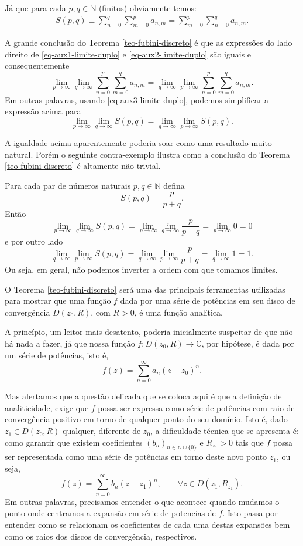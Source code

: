 Já que para cada $p,q\in\mathbb{N}$ (finitos) obviamente temos:
\begin{align}
\label{eq-aux3-limite-duplo}
S(p,q) 
\equiv 
\sum_{n=0}^{q} \sum_{m=0}^{p}a_{n,m} 
= 
\sum_{m=0}^{p}\sum_{n=0}^{q} a_{n,m}. 
\end{align}

A grande conclusão do Teorema \ref{teo-fubini-discreto} é que
as expressões do lado direito de \eqref{eq-aux1-limite-duplo}
e \eqref{eq-aux2-limite-duplo} são iguais e consequentemente 
\[
\lim_{p\to\infty} \lim_{q\to\infty} \sum_{n=0}^{p} \sum_{m=0}^{q}a_{n,m}
=
\lim_{q\to\infty}\lim_{p\to\infty} \sum_{n=0}^{p} \sum_{m=0}^{q}a_{n,m}.
\]
Em outras palavras, usando \eqref{eq-aux3-limite-duplo}, podemos simplificar
a expressão acima para
\[
\lim_{p\to\infty} \lim_{q\to\infty} S(p,q)
=
\lim_{q\to\infty}\lim_{p\to\infty} S(p,q).
\]

A igualdade acima aparentemente poderia soar como uma resultado muito natural. 
Porém o seguinte contra-exemplo ilustra como a conclusão do Teorema
\ref{teo-fubini-discreto} é altamente não-trivial.

\begin{exemplo}
Para cada par de números naturais $p,q\in\mathbb{N}$ defina 
\[
S(p,q) =  \frac{p}{p+q}.
\]
Então 
\[
\lim_{p\to\infty} \lim_{q\to\infty} S(p,q)
= 
\lim_{p\to\infty} \lim_{q\to\infty} \frac{p}{p+q}
= 
\lim_{p\to\infty} 0
=0
\]
e por outro lado 
\[
\lim_{q\to\infty}\lim_{p\to\infty} S(p,q)
=
\lim_{q\to\infty} \lim_{p\to\infty} \frac{p}{p+q}
=
\lim_{q\to\infty} 1
=1.
\]
Ou seja, em geral, não podemos inverter a ordem com que tomamos
limites.
\end{exemplo}


O Teorema \ref{teo-fubini-discreto} será uma das principais ferramentas utilizadas 
para mostrar que uma função $f$ dada por uma série
de potências em seu disco de convergência $D(z_0,R)$, com $R>0$,  
é uma função analítica.

A princípio, um leitor mais desatento, poderia inicialmente suspeitar de 
que não há nada a fazer, já que nossa função 
$f:D(z_0,R)\to\mathbb{C}$, por hipótese, é dada
por um série de potências, isto é,
\[
f(z) = \sum_{n=0}^{\infty}a_n(z-z_0)^n. 
\]

Mas alertamos que a questão delicada que se coloca aqui 
é que a definição de analiticidade,
exige que $f$ possa ser expressa como série de potências com raio 
de convergência positivo em torno de qualquer ponto do seu domínio. 
Isto é, dado
$z_1\in D(z_0,R)$ qualquer, diferente de $z_0$, a dificuldade técnica que 
se apresenta é: como garantir
que existem coeficientes $(b_n)_{n\in\mathbb{N}\cup\{0\}}$ 
e $R_{z_1}>0$ tais que $f$ possa ser representada como uma 
série de potências em torno deste novo ponto $z_1$, ou seja,
\[
f(z) = \sum_{n=0}^{\infty} b_n(z-z_1)^n, \qquad \forall z\in D(z_1,R_{z_1}).
\]
Em outras palavras, precisamos entender o que acontece quando mudamos
o ponto onde centramos a expansão em série de potencias de $f$. 
Isto passa por entender como se relacionam os coeficientes de cada 
uma destas expansões bem como os raios dos discos de convergência,
respectivos. 

